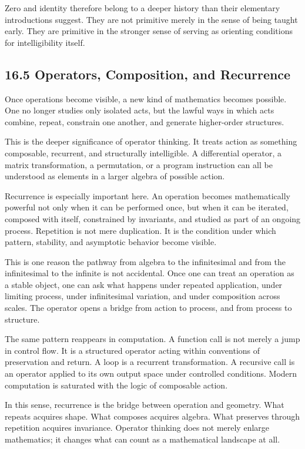 \documentclass[
]{article}
\begin{document}
Zero and identity therefore belong to a deeper history than their
elementary introductions suggest. They are not primitive merely in the
sense of being taught early. They are primitive in the stronger sense of
serving as orienting conditions for intelligibility itself.

\hypertarget{operators-composition-and-recurrence}{%
\subsection{16.5 Operators, Composition, and
Recurrence}\label{operators-composition-and-recurrence}}

Once operations become visible, a new kind of mathematics becomes
possible. One no longer studies only isolated acts, but the lawful ways
in which acts combine, repeat, constrain one another, and generate
higher-order structures.

This is the deeper significance of operator thinking. It treats action
as something composable, recurrent, and structurally intelligible. A
differential operator, a matrix transformation, a permutation, or a
program instruction can all be understood as elements in a larger
algebra of possible action.

Recurrence is especially important here. An operation becomes
mathematically powerful not only when it can be performed once, but when
it can be iterated, composed with itself, constrained by invariants, and
studied as part of an ongoing process. Repetition is not mere
duplication. It is the condition under which pattern, stability, and
asymptotic behavior become visible.

This is one reason the pathway from algebra to the infinitesimal and
from the infinitesimal to the infinite is not accidental. Once one can
treat an operation as a stable object, one can ask what happens under
repeated application, under limiting process, under infinitesimal
variation, and under composition across scales. The operator opens a
bridge from action to process, and from process to structure.

The same pattern reappears in computation. A function call is not merely
a jump in control flow. It is a structured operator acting within
conventions of preservation and return. A loop is a recurrent
transformation. A recursive call is an operator applied to its own
output space under controlled conditions. Modern computation is
saturated with the logic of composable action.

In this sense, recurrence is the bridge between operation and geometry.
What repeats acquires shape. What composes acquires algebra. What
preserves through repetition acquires invariance. Operator thinking does
not merely enlarge mathematics; it changes what can count as a
mathematical landscape at all.
\end{document}
